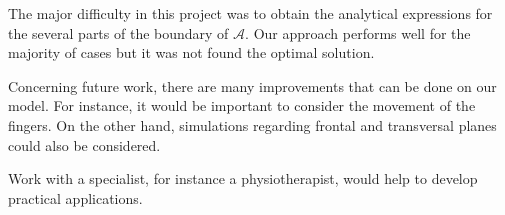 %
%
%
%
%

The major difficulty in this project was to obtain the analytical expressions for the several parts of the boundary of $\mathcal{A}$. Our approach performs well for the majority of cases but it was not found the optimal solution.

Concerning future work, there are many improvements that can be done on our model. For instance, it would be important to consider the movement of the fingers. On the other hand, simulations regarding frontal and transversal planes could also be considered.

Work with a specialist, for instance a physiotherapist, would help to develop practical applications. 














